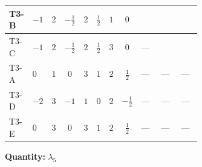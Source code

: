 \documentclass[8pt]{article}
\begin{document}
\begin{landscape}
\begin{longtable}{@{}llcccccc >{\raggedright\arraybackslash}p{0.21\linewidth} >{\raggedright\arraybackslash}p{0.21\linewidth} >{\raggedright\arraybackslash}p{0.21\linewidth}@{}}
T3-B & $-1$ & $2$ & $-\frac{1}{2}$ & $2$ & $\frac{1}{2}$ & $1$ & $0$ & \scriptsize\adjustbox{max width=\linewidth}{$\begin{gathered} {\lambda_5} \left(T_{\nu}^{(1)}+T_{\nu}^{(2)}+6 \operatorname{Tr}\!\left({Y_d}\,\left({Y_d}\right)^{\dagger}\right)+2 \operatorname{Tr}\!\left({Y_e}\,\left({Y_e}\right)^{\dagger}\right)+6 \operatorname{Tr}\!\left({Y_u}\,\left({Y_u}\right)^{\dagger}\right)+\frac{{\lambda_{12}^{(A)}}}{6}+\frac{2 {\lambda_{HS_1}^{(A)}}}{3}+2 {\lambda_{HS_2}^{(A)}}\right)\end{gathered}$} & \scriptsize\adjustbox{max width=\linewidth}{$\begin{gathered} +2 \left({\lambda_{7}}\right)^{*} \operatorname{Tr}\!\left({y_2}\,\left({y_1}\right)^{\dagger}\right)\end{gathered}$} & \scriptsize\adjustbox{max width=\linewidth}{$\begin{gathered} +2 \left({\lambda_{8}}\right)^{*} \operatorname{Tr}\!\left({y_1}\,\left({y_2}\right)^{\dagger}\right)\end{gathered}$} \\
\midrule
T3-C & $-1$ & $2$ & $-\frac{1}{2}$ & $2$ & $\frac{1}{2}$ & $3$ & $0$ & --- & \scriptsize\adjustbox{max width=\linewidth}{$\begin{gathered} +3 \left({\lambda_{7}}\right)^{*} \operatorname{Tr}\!\left({y_2}\,\left({y_1}\right)^{\dagger}\right)\end{gathered}$} & \scriptsize\adjustbox{max width=\linewidth}{$\begin{gathered} +3 \left({\lambda_{8}}\right)^{*} \operatorname{Tr}\!\left({y_1}\,\left({y_2}\right)^{\dagger}\right)\end{gathered}$} \\
\midrule
T3-A & $0$ & $1$ & $0$ & $3$ & $1$ & $2$ & $\frac{1}{2}$ & --- & --- & --- \\
\midrule
T3-D & $-2$ & $3$ & $-1$ & $1$ & $0$ & $2$ & $-\frac{1}{2}$ & --- & --- & --- \\
\midrule
T3-E & $0$ & $3$ & $0$ & $3$ & $1$ & $2$ & $\frac{1}{2}$ & --- & --- & --- \\
\midrule
\bottomrule
\end{longtable}
\clearpage
\noindent\textbf{Quantity: }$\lambda_5$\par\smallskip

\end{landscape}
\end{document}
